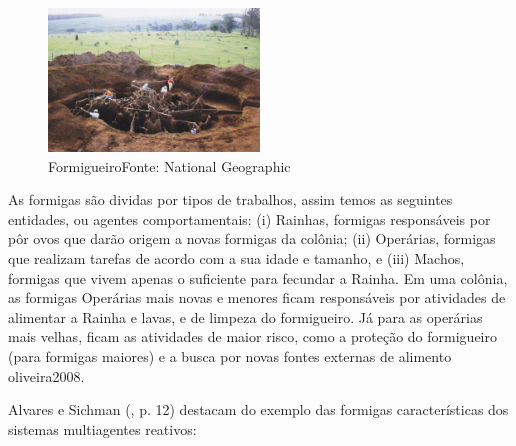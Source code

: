 \begin{figure}[h]
\centering
\label{f02}
\includegraphics[width=0.5\textwidth]{figuras/f02}
\caption{Formigueiro\newline Fonte: National Geographic}

\end{figure}

As formigas são dividas por tipos de trabalhos, assim temos as seguintes entidades, ou agentes comportamentais: (i) Rainhas, formigas responsáveis por pôr ovos que darão origem a novas formigas da colônia; (ii) Operárias, formigas que realizam tarefas de acordo com a sua idade e tamanho, e (iii) Machos, formigas que vivem apenas o suficiente para fecundar a Rainha. Em uma colônia, as formigas Operárias mais novas e menores ficam responsáveis por atividades de alimentar a Rainha e lavas, e de limpeza do formigueiro. Já para as operárias mais velhas, ficam as atividades de maior risco, como a proteção do formigueiro (para formigas maiores) e a busca por novas fontes externas de alimento  {oliveira2008}.

Alvares e Sichman (\citeyear{alvares1997}, p. 12) destacam do exemplo das formigas características dos sistemas multiagentes reativos:

